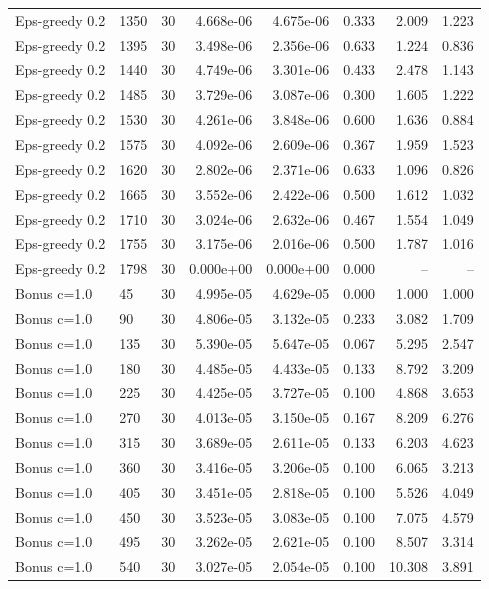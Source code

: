 \begin{scriptsize}
\begin{longtable}{llrrrrrr}
Eps-greedy 0.2 & 1350 & 30 & 4.668e-06 & 4.675e-06 & 0.333 & 2.009 & 1.223 \\
Eps-greedy 0.2 & 1395 & 30 & 3.498e-06 & 2.356e-06 & 0.633 & 1.224 & 0.836 \\
Eps-greedy 0.2 & 1440 & 30 & 4.749e-06 & 3.301e-06 & 0.433 & 2.478 & 1.143 \\
Eps-greedy 0.2 & 1485 & 30 & 3.729e-06 & 3.087e-06 & 0.300 & 1.605 & 1.222 \\
Eps-greedy 0.2 & 1530 & 30 & 4.261e-06 & 3.848e-06 & 0.600 & 1.636 & 0.884 \\
Eps-greedy 0.2 & 1575 & 30 & 4.092e-06 & 2.609e-06 & 0.367 & 1.959 & 1.523 \\
Eps-greedy 0.2 & 1620 & 30 & 2.802e-06 & 2.371e-06 & 0.633 & 1.096 & 0.826 \\
Eps-greedy 0.2 & 1665 & 30 & 3.552e-06 & 2.422e-06 & 0.500 & 1.612 & 1.032 \\
Eps-greedy 0.2 & 1710 & 30 & 3.024e-06 & 2.632e-06 & 0.467 & 1.554 & 1.049 \\
Eps-greedy 0.2 & 1755 & 30 & 3.175e-06 & 2.016e-06 & 0.500 & 1.787 & 1.016 \\
Eps-greedy 0.2 & 1798 & 30 & 0.000e+00 & 0.000e+00 & 0.000 & -- & -- \\
Bonus c=1.0 & 45 & 30 & 4.995e-05 & 4.629e-05 & 0.000 & 1.000 & 1.000 \\
Bonus c=1.0 & 90 & 30 & 4.806e-05 & 3.132e-05 & 0.233 & 3.082 & 1.709 \\
Bonus c=1.0 & 135 & 30 & 5.390e-05 & 5.647e-05 & 0.067 & 5.295 & 2.547 \\
Bonus c=1.0 & 180 & 30 & 4.485e-05 & 4.433e-05 & 0.133 & 8.792 & 3.209 \\
Bonus c=1.0 & 225 & 30 & 4.425e-05 & 3.727e-05 & 0.100 & 4.868 & 3.653 \\
Bonus c=1.0 & 270 & 30 & 4.013e-05 & 3.150e-05 & 0.167 & 8.209 & 6.276 \\
Bonus c=1.0 & 315 & 30 & 3.689e-05 & 2.611e-05 & 0.133 & 6.203 & 4.623 \\
Bonus c=1.0 & 360 & 30 & 3.416e-05 & 3.206e-05 & 0.100 & 6.065 & 3.213 \\
Bonus c=1.0 & 405 & 30 & 3.451e-05 & 2.818e-05 & 0.100 & 5.526 & 4.049 \\
Bonus c=1.0 & 450 & 30 & 3.523e-05 & 3.083e-05 & 0.100 & 7.075 & 4.579 \\
Bonus c=1.0 & 495 & 30 & 3.262e-05 & 2.621e-05 & 0.100 & 8.507 & 3.314 \\
Bonus c=1.0 & 540 & 30 & 3.027e-05 & 2.054e-05 & 0.100 & 10.308 & 3.891 \\

\end{longtable}
\end{scriptsize}
